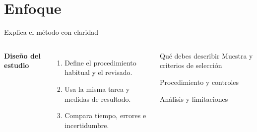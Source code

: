 \section{Enfoque}
\begin{frame}{Explica el método con claridad}
\begin{columns}[T,onlytextwidth]
\textbf{Diseño del estudio}\par\vspace{3mm}
\begin{enumerate}\setlength{\itemsep}{4mm}
\item Define el procedimiento habitual y el revisado.
\item Usa la misma tarea y medidas de resultado.
\item Compara tiempo, errores e incertidumbre.
\end{enumerate}
\begin{block}{Qué debes describir}
Muestra y criterios de selección\par\medskip
Procedimiento y controles\par\medskip
Análisis y limitaciones
\end{block}
\end{columns}
\end{frame}
